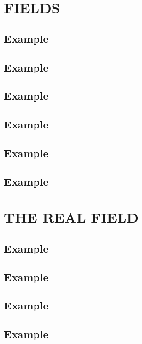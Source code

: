 \section{FIELDS}

\subsection*{\textbf{Example}}
\label{sec:12}


\subsection*{\textbf{Example}}
\label{sec:14}
\subsection*{\textbf{Example}}
\label{sec:15}
\subsection*{\textbf{Example}}
\label{sec:16}
\subsection*{\textbf{Example}}
\label{sec:17}
\subsection*{\textbf{Example}}
\label{sec:18}


\section{THE REAL FIELD}

\subsection*{\textbf{Example}}
\label{sec:19}
\subsection*{\textbf{Example}}
\label{sec:20}
\subsection*{\textbf{Example}}
\label{sec:21}
\subsection*{\textbf{Example}}
\label{sec:22}


